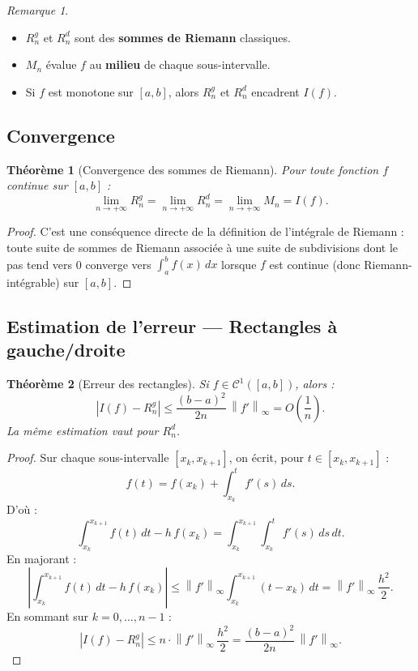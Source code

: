 \documentclass[a4paper,12pt]{article}
\theoremstyle{definition}
\theoremstyle{plain}
\newtheorem{theoreme}{Théorème}[section]
\theoremstyle{remark}
\newtheorem{remarque}{Remarque}[section]
\newcommand{\abs}[1]{\left|#1\right|}
\newcommand{\norme}[1]{\left\|#1\right\|_\infty}
\begin{document}
\begin{remarque}
\begin{itemize}
  \item $R_n^g$ et $R_n^d$ sont des \textbf{sommes de Riemann} classiques.
  \item $M_n$ évalue $f$ au \textbf{milieu} de chaque sous-intervalle.
  \item Si $f$ est monotone sur $[a,b]$, alors $R_n^g$ et $R_n^d$ encadrent $I(f)$.
\end{itemize}
\end{remarque}

\subsection{Convergence}

\begin{theoreme}[Convergence des sommes de Riemann]
Pour toute fonction $f$ continue sur $[a,b]$ :
\[
  \lim_{n\to+\infty} R_n^g = \lim_{n\to+\infty} R_n^d = \lim_{n\to+\infty} M_n = I(f).
\]
\end{theoreme}

\begin{proof}
C'est une conséquence directe de la définition de l'intégrale de Riemann : toute suite de sommes de Riemann associée à une suite de subdivisions dont le pas tend vers 0 converge vers $\int_a^b f(x)\,dx$ lorsque $f$ est continue (donc Riemann-intégrable) sur $[a,b]$.
\end{proof}

\subsection{Estimation de l'erreur --- Rectangles à gauche/droite}

\begin{theoreme}[Erreur des rectangles]\label{thm:erreur_rectangles}
Si $f \in \mathcal{C}^1([a,b])$, alors :
\[
  \abs{I(f) - R_n^g} \leq \frac{(b-a)^2}{2n}\,\norme{f'} = O\!\left(\frac{1}{n}\right).
\]
La même estimation vaut pour $R_n^d$.
\end{theoreme}

\begin{proof}
Sur chaque sous-intervalle $[x_k, x_{k+1}]$, on écrit, pour $t \in [x_k, x_{k+1}]$ :
\[
  f(t) = f(x_k) + \int_{x_k}^t f'(s)\,ds.
\]
D'où :
\[
  \int_{x_k}^{x_{k+1}} f(t)\,dt - h\,f(x_k) = \int_{x_k}^{x_{k+1}} \int_{x_k}^t f'(s)\,ds\,dt.
\]
En majorant :
\[
  \abs{\int_{x_k}^{x_{k+1}} f(t)\,dt - h\,f(x_k)} \leq \norme{f'} \int_{x_k}^{x_{k+1}} (t - x_k)\,dt = \norme{f'}\,\frac{h^2}{2}.
\]
En sommant sur $k = 0, \ldots, n-1$ :
\[
  \abs{I(f) - R_n^g} \leq n \cdot \norme{f'}\,\frac{h^2}{2} = \frac{(b-a)^2}{2n}\,\norme{f'}.
\]
\end{proof}
\end{document}
